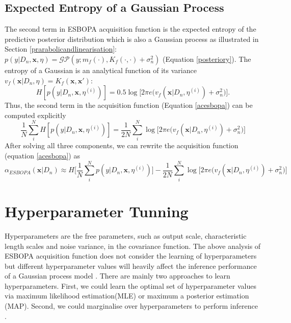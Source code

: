 \documentclass[a4paper,11pt]{report}
\begin{document}
\subsection{Expected Entropy of a Gaussian Process}
The second term in ESBOPA acquisition function is the expected entropy of the predictive posterior distribution which is also a Gaussian process as illustrated in Section \ref{prarabolicandlinearisation}: $ p(y\vert D_n, \mathbf{x},\eta) = \mathcal{GP} (y; m_{f} (\cdot), K_{f} (\cdot,\cdot)+\sigma_n^2) $ (Equation \ref{posteriory}). The entropy of a Gaussian is an analytical function of its variance $v_f(\mathbf{x} \vert D_n,\eta )=K_f(\mathbf{x},\mathbf{x}')$:  
	\[ H[p(y \vert D_n,\mathbf{x},\eta^{(i)})] = 0.5 \log \big[2\pi e \big(v_f(\mathbf{x} \vert D_n,\eta^{(i)} )+\sigma_n^2 \big) \big] . \]
Thus, the second term in the acquisition function (Equation \ref{acesbopa}) can be computed explicitly
 \begin{equation}
 	\frac{1}{N} \sum_i^{N} H [p(y \vert D_n,\mathbf{x},\eta^{(i)})] = \frac{1}{2N} \sum_i^{N} \log \big[2\pi e \big(v_f(\mathbf{x} \vert D_n,\eta^{(i)} )+\sigma_n^2 \big) \big]  
 \end{equation} 
After solving all three components, we can rewrite the acquisition function (equation \ref{acesbopa}) as
	\begin{equation} \label{acesbopa2}
	\alpha_{ESBOPA}(\mathbf{x} \vert D_n) \approx H \Big[  \frac{1}{N} \sum_i^{N} p(y \vert D_n,\mathbf{x},\eta^{(i)})  \Big] -  \frac{1}{2N} \sum_i^{N} \log \big[ 2\pi e \big(v_f(\mathbf{x} \vert D_n,\eta^{(i)})+\sigma_n^2\big) \big] 
	\end{equation} 
	

\section{Hyperparameter Tunning} \label{hyperparametertunning}
Hyperparameters are the free parameters, such as output scale, characteristic length scales and noise variance, in the covariance function. The above analysis of ESBOPA acquisition function does not consider the learning of hyperparameters but different hyperparameter values will heavily affect the inference performance of a Gaussian process model \cite{rasmussen2006gaussian}. 
There are mainly two approaches to learn hyperparameters. First, we could learn the optimal set of hyperparameter values via maximum likelihood estimation(MLE) or maximum a posterior estimation (MAP). Second, we could marginalise over hyperparameters to perform inference \cite{C19 lecture notes}.
\end{document}
